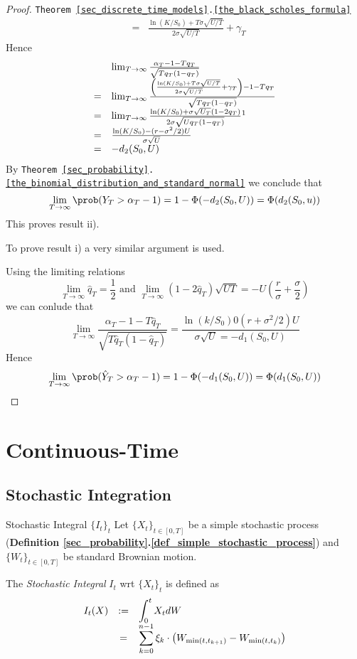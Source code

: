 \documentclass[11pt,a4paper]{article}
\begin{document}
\begin{proof}{\texttt{Theorem  \ref{sec_discrete_time_models}.\ref{the_black_scholes_formula}}}
\[\begin{array}{rcl}
      &=&\frac{\ln(K/S_0)+T\sigma\sqrt{U/T}}{2\sigma\sqrt{U/T}}+\gamma_T
    \end{array}\]
    Hence
    \[\begin{array}{rl}
      &\lim_{T\to\infty}\frac{\alpha_T-1-Tq_T}{\sqrt{Tq_T(1-q_T)}}\\
      =&\lim_{T\to\infty}\frac{\left(\frac{\ln(K/S_0)+T\sigma\sqrt{U/T}}{2\sigma\sqrt{U/T}}+\gamma_T\right)-1-Tq_T}{\sqrt{Tq_T(1-q_T)}}\\
      =&\lim_{T\to\infty}\frac{\ln(K/S_0)+\sigma\sqrt{U_T}(1-2q_T)}{2\sigma\sqrt{Uq_T(1-q_T)}}\footnotemark\\
      =&\frac{\ln(K/S_0)-(r-\sigma^2/2)U}{\sigma\sqrt{U}}\\
      =&-d_2(S_0,U)
    \end{array}\]
    By \texttt{Theorem \ref{sec_probability}.\ref{the_binomial_distribution_and_standard_normal}} we conclude that
    \[ \lim_{T\to\infty}\prob(Y_T>\alpha_T-1)=1-\Phi(-d_2(S_0,U))=\Phi(d_2(S_0,u)) \]
    This proves result ii).
    \par To prove result i) a very similar argument is used.
    \par Using the limiting relations
    \[ \lim_{T\to\infty}\hat{q}_T=\frac12\text{ and }\lim_{T\to\infty}(1-2\hat{q}_T)\sqrt{UT}=-U\left(\frac{r}\sigma+\frac\sigma2\right) \]
    we can conlude that
    \[ \lim_{T\to\infty}\frac{\alpha_T-1-T\hat{q}_T}{\sqrt{T\hat{q}_T(1-\hat{q}_T)}}=\frac{\ln(k/S_0)0(r+\sigma^2/2)U}{\sigma\sqrt{U}=-d_1(S_0,U)} \]
    Hence
    \[ \lim_{T\to\infty}\prob(\hat{Y}_T>\alpha_T-1)=1-\Phi(-d_1(S_0,U))=\Phi(d_1(S_0,U)) \]
    \proved
  \end{proof}

\section{Continuous-Time}\label{sec_continuous_time_models}

\subsection{Stochastic Integration}

  \begin{definition}{Stochastic Integral $\{I_t\}_t$}
    Let $\{X_t\}_{t\in[0,T]}$ be a simple stochastic process (\textbf{Definition \ref{sec_probability}.\ref{def_simple_stochastic_process}}) and $\{W_t\}_{t\in[0,T]}$ be standard Brownian motion.
    \par The \textit{Stochastic Integral} $I_t$ wrt $\{X_t\}_t$ is defined as
    \[\everymath={\displaystyle}\begin{array}{rcl}
      I_t(X)&:=&\int_0^tX_tdW\\
      &=&\sum_{k=0}^{n-1}\xi_k\cdot\left(W_{\min(t,t_{k+1})}-W_{\min(t,t_k)}\right)
    \end{array}\]
  \end{definition}
\end{document}
